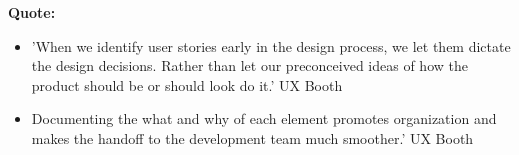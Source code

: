 \textbf{Quote:}

\begin{itemize}
\item 'When we identify user stories early in the design process, we let them dictate the design decisions. Rather than let our preconceived ideas of how the product should be or should look do it.' UX Booth
\item Documenting the what and why of each element promotes organization and makes the handoff to the development team much smoother.' UX Booth
\end{itemize}


